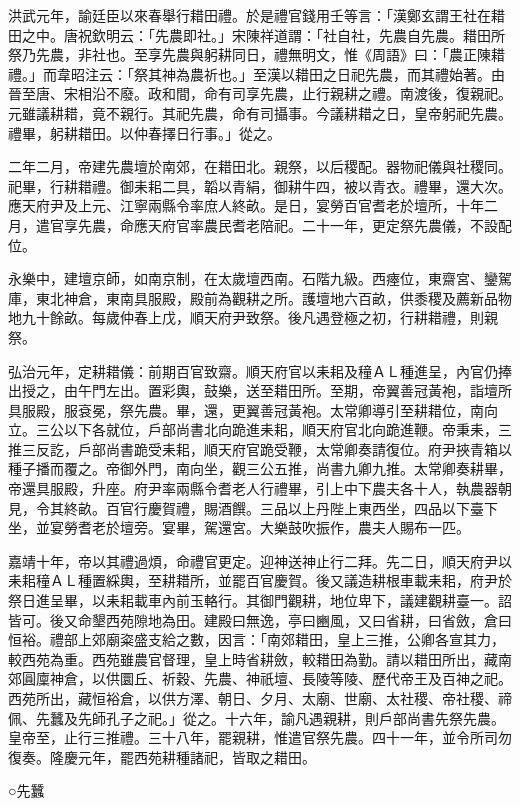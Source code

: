 洪武元年，諭廷臣以來春舉行耤田禮。於是禮官錢用壬等言：「漢鄭玄謂王社在耤田之中。唐祝欽明云：「先農即社。」宋陳祥道謂：「社自社，先農自先農。耤田所祭乃先農，非社也。至享先農與躬耕同日，禮無明文，惟《周語》曰：「農正陳耤禮。」而韋昭注云：「祭其神為農祈也。」至漢以耤田之日祀先農，而其禮始著。由晉至唐、宋相沿不廢。政和間，命有司享先農，止行親耕之禮。南渡後，復親祀。元雖議耕耤，竟不親行。其祀先農，命有司攝事。今議耕耤之日，皇帝躬祀先農。禮畢，躬耕耤田。以仲春擇日行事。」從之。

二年二月，帝建先農壇於南郊，在耤田北。親祭，以后稷配。器物祀儀與社稷同。祀畢，行耕耤禮。御耒耜二具，韜以青絹，御耕牛四，被以青衣。禮畢，還大次。應天府尹及上元、江寧兩縣令率庶人終畝。是日，宴勞百官耆老於壇所，十年二月，遣官享先農，命應天府官率農民耆老陪祀。二十一年，更定祭先農儀，不設配位。

永樂中，建壇京師，如南京制，在太歲壇西南。石階九級。西瘞位，東齋宮、鑾駕庫，東北神倉，東南具服殿，殿前為觀耕之所。護壇地六百畝，供黍稷及薦新品物地九十餘畝。每歲仲春上戊，順天府尹致祭。後凡遇登極之初，行耕耤禮，則親祭。

弘治元年，定耕耤儀：前期百官致齋。順天府官以耒耜及穜ＡＬ種進呈，內官仍捧出授之，由午門左出。置彩輿，鼓樂，送至耤田所。至期，帝翼善冠黃袍，詣壇所具服殿，服袞冕，祭先農。畢，還，更翼善冠黃袍。太常卿導引至耕耤位，南向立。三公以下各就位，戶部尚書北向跪進耒耜，順天府官北向跪進鞭。帝秉耒，三推三反訖，戶部尚書跪受耒耜，順天府官跪受鞭，太常卿奏請復位。府尹挾青箱以種子播而覆之。帝御外門，南向坐，觀三公五推，尚書九卿九推。太常卿奏耕畢，帝還具服殿，升座。府尹率兩縣令耆老人行禮畢，引上中下農夫各十人，執農器朝見，令其終畝。百官行慶賀禮，賜酒饌。三品以上丹陛上東西坐，四品以下臺下坐，並宴勞耆老於壇旁。宴畢，駕還宮。大樂鼓吹振作，農夫人賜布一匹。

嘉靖十年，帝以其禮過煩，命禮官更定。迎神送神止行二拜。先二日，順天府尹以耒耜穜ＡＬ種置綵輿，至耕耤所，並罷百官慶賀。後又議造耕根車載耒耜，府尹於祭日進呈畢，以耒耜載車內前玉輅行。其御門觀耕，地位卑下，議建觀耕臺一。詔皆可。後又命墾西苑隙地為田。建殿曰無逸，亭曰豳風，又曰省耕，曰省斂，倉曰恒裕。禮部上郊廟粢盛支給之數，因言：「南郊耤田，皇上三推，公卿各宣其力，較西苑為重。西苑雖農官督理，皇上時省耕斂，較耤田為勤。請以耤田所出，藏南郊圓廩神倉，以供圜丘、祈穀、先農、神祇壇、長陵等陵、歷代帝王及百神之祀。西苑所出，藏恒裕倉，以供方澤、朝日、夕月、太廟、世廟、太社稷、帝社稷、禘佩、先蠶及先師孔子之祀。」從之。十六年，諭凡遇親耕，則戶部尚書先祭先農。皇帝至，止行三推禮。三十八年，罷親耕，惟遣官祭先農。四十一年，並令所司勿復奏。隆慶元年，罷西苑耕種諸祀，皆取之耤田。

○先蠶

